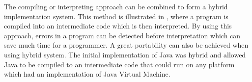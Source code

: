 
The compiling or interpreting approach can be combined to form a hybrid implementation system. This method is illustrated in , where a program is compiled into an intermediate code which is then interpreted. By using this approach, errors in a program can be detected before interpretation which can save much time for a programmer. A great portability can also be achieved when using hybrid system. The initial implementation of Java was hybrid and allowed Java to be compiled to an intermediate code that could run on any platform which had an implementation of Java Virtual Machine\cite[p. 50]{sebesta2013}. 

